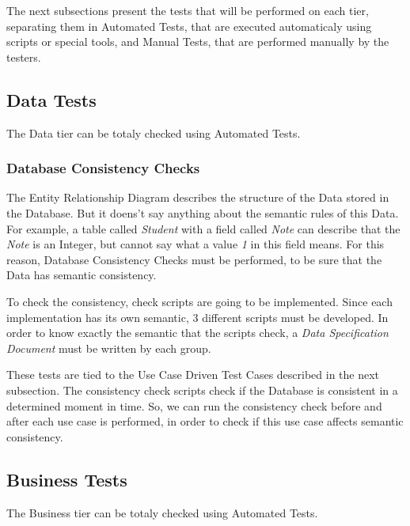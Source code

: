 \documentclass[11pt]{article}
\begin{document}
The next subsections present the tests that will be performed on each tier, separating them in Automated Tests, that are executed automaticaly using scripts or special tools, and Manual Tests, that are performed manually by the testers.

\subsection{Data Tests}

\indent

The Data tier can be totaly checked using Automated Tests.

\subsubsection*{Database Consistency Checks}

\indent

The Entity Relationship Diagram describes the structure of the Data stored in the Database. But it doens't say anything about the semantic rules of this Data. For example, a table called {\it Student} with a field called {\it Note} can describe that the {\it Note} is an Integer, but cannot say what a value {\it 1} in this field means. For this reason, Database Consistency Checks must be performed, to be sure that the Data has semantic consistency.

To check the consistency, check scripts are going to be implemented. Since each implementation has its own semantic, 3 different scripts must be developed. In order to know exactly the semantic that the scripts check, a {\it Data Specification Document} must be written by each group.

These tests are tied to the Use Case Driven Test Cases described in the next subsection. The consistency check scripts check if the Database is consistent in a determined moment in time. So, we can run the consistency check before and after each use case is performed, in order to check if this use case affects semantic consistency.

\subsection{Business Tests}

\indent

The Business tier can be totaly checked using Automated Tests.
\end{document}
